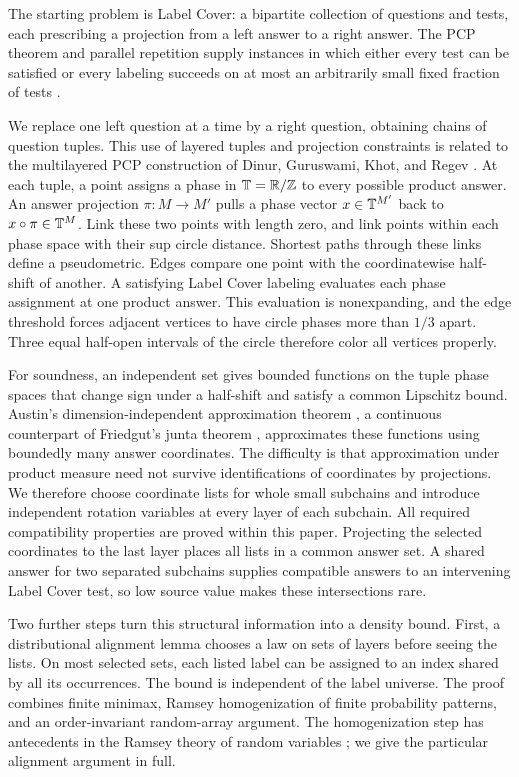 The starting problem is Label Cover: a bipartite collection of questions
and tests, each prescribing a projection from a left answer to a right
answer. The PCP theorem and parallel repetition supply instances in
which either every test can be satisfied or every labeling succeeds
on at most an arbitrarily small fixed fraction of tests
\cite{AroraEtAl1998,Raz1998,DinurSteurer2014}.

We replace one left question at a time by a right question, obtaining
chains of question tuples. This use of layered tuples and projection
constraints is related to the multilayered PCP construction of
Dinur, Guruswami, Khot, and Regev \cite{DinurGuruswamiKhotRegev2005}.
At each tuple, a point assigns a phase in $\mathbb T=\mathbb R/\mathbb Z$ to every
possible product answer. An answer projection $\pi:M\to M' $ pulls a
phase vector $x\in\mathbb T^{M'}$ back to $x\circ\pi\in\mathbb T^M$.
Link these two points with length zero, and link points within each
phase space with their sup circle distance. Shortest paths through
these links define a pseudometric. Edges compare one point with
the coordinatewise half-shift of another. A satisfying Label Cover
labeling evaluates each phase assignment at one product answer.
This evaluation is nonexpanding, and the edge threshold forces adjacent
vertices to have circle phases more than $1/3$ apart. Three equal
half-open intervals of the circle therefore color all vertices properly.

For soundness, an independent set gives bounded functions on the tuple
phase spaces that change sign under a half-shift and satisfy a common
Lipschitz bound. Austin's dimension-independent approximation theorem
\cite{Austin2016}, a continuous counterpart of Friedgut's junta theorem
\cite{Friedgut1998}, approximates these functions using boundedly many
answer coordinates. The difficulty is that approximation under product
measure need not survive identifications of coordinates by projections.
We therefore choose coordinate lists for whole small subchains and
introduce independent rotation variables at every layer of each
subchain. All required compatibility properties are proved within this
paper. Projecting the selected coordinates to the last layer places
all lists in a common answer set. A shared answer for two separated
subchains supplies compatible answers to an intervening Label Cover
test, so low source value makes these intersections rare.

Two further steps turn this structural information into a density
bound. First, a distributional alignment lemma chooses a law on sets
of layers before seeing the lists. On most selected sets, each listed
label can be assigned to an index shared by all its occurrences.
The bound is independent of the label universe. The proof combines
finite minimax, Ramsey homogenization of finite probability patterns,
and an order-invariant random-array argument. The homogenization step
has antecedents in the Ramsey theory of random variables
\cite{TrotterWinkler1998}; we give the particular alignment argument
in full.

